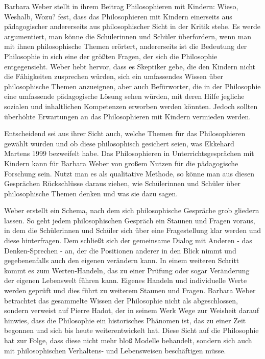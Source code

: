 Barbara Weber stellt in ihrem Beitrag \glqq Philosophieren mit Kindern: Wieso, Weshalb, Wozu?\grqq{} fest, dass das Philosophieren mit Kindern einerseits aus pädagogischer andererseits aus philosophischer Sicht in der Kritik stehe. 
Es werde argumentiert, man könne die Schülerinnen und Schüler überfordern, wenn man mit ihnen philosophische Themen erörtert, andererseits ist die Bedeutung der Philosophie in sich eine der größten Fragen, der sich die Philosophie entgegensieht. 
Weber hebt hervor, dass es Skeptiker gebe, die den Kindern nicht die Fähigkeiten zusprechen würden, sich ein umfassendes Wissen über philosophische Themen anzueignen, aber auch Befürworter, die in der Philosophie eine umfassende pädagogische Lösung sehen würden, mit deren Hilfe jegliche sozialen und inhaltlichen Kompetenzen erworben werden könnten\cite{BW13, S.623}.
Jedoch sollten überhöhte Erwartungen an das Philosophieren mit Kindern vermieden werden. 

Entscheidend sei aus ihrer Sicht auch, welche Themen für das Philosophieren gewählt würden und ob diese philosophisch gesichert seien, was Ekkehard Martens 1999 bezweifelt habe\cite{BW13, S.624}. 
Das Philosophieren in Unterrichtsgesprächen mit Kindern kann für Barbara Weber von großem Nutzen für die pädagogische Forschung sein. 
Nutzt man es als qualitative Methode, so könne man aus diesen Gesprächen Rückschlüsse daraus ziehen, wie Schülerinnen und Schüler über philosophische Themen denken und was sie dazu sagen.

Weber erstellt ein Schema, nach dem sich philosophische Gespräche grob gliedern lassen. 
So geht jedem philosophischen Gespräch ein Staunen und Fragen voraus, in dem die Schülerinnen und Schüler sich über eine Fragestellung klar werden und diese hinterfragen. 
Dem schließt sich der gemeinsame Dialog mit Anderen - das Denken-Sprechen - an, der die Positionen anderer in den Blick nimmt und gegebenenfalls auch den eigenen verändern kann. 
In einem weiteren Schritt kommt es zum Werten-Handeln, das zu einer Prüfung oder sogar Veränderung der eigenen Lebenswelt führen kann. 
Eigenes Handeln und individuelle Werte werden geprüft und dies führt zu weiterem Staunen und Fragen\cite{BW13, S.626}.
Barbara Weber betrachtet das gesammelte Wissen der Philosophie nicht als abgeschlossen, sondern verweist auf Pierre Hadot, der in seinem Werk \glqq Wege zur Weisheit\grqq{} darauf hinwies, dass \glqq die Philosophie ein historisches Phänomen ist, das zu einer Zeit begonnen und sich bis heute weiterentwickelt hat.\grqq{}
Diese Sicht auf die Philosophie hat zur Folge, dass diese nicht mehr bloß Modelle behandelt, sondern sich auch mit philosophischen Verhaltens- und Lebensweisen beschäftigen müsse.

